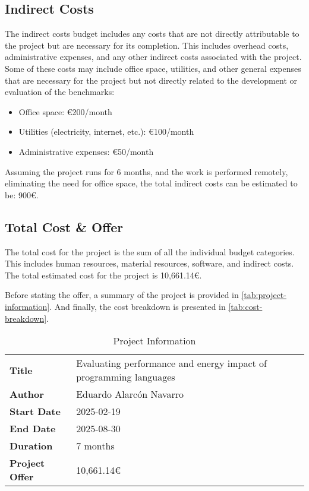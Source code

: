 \subsection{Indirect Costs}
The indirect costs budget includes any costs that are not directly attributable to the project but are necessary for its completion. This includes overhead costs, administrative expenses, and any other indirect costs associated with the project. 
Some of these costs may include office space, utilities, and other general expenses that are necessary for the project but not directly related to the development or evaluation of the benchmarks:
\begin{itemize}
    \item Office space: €200/month
    \item Utilities (electricity, internet, etc.): €100/month
    \item Administrative expenses: €50/month
\end{itemize}
Assuming the project runs for 6 months, and the work is performed remotely, eliminating the need for office space, the total indirect costs can be estimated to be: 900€.

\subsection{Total Cost \& Offer}
The total cost for the project is the sum of all the individual budget categories. This includes human resources, material resources, software, and indirect costs. The total estimated cost for the project is 10,661.14€.

Before stating the offer, a summary of the project is provided in \autoref{tab:project-information}. And finally, the cost breakdown is presented in \autoref{tab:cost-breakdown}.


\begin{table}[h]
  \centering
  \begin{tabular}{|l|l|}
    \hline
    \textbf{Title}         & Evaluating performance and energy impact of programming languages \\ 
    \textbf{Author}        & Eduardo Alarcón Navarro \\ 
    \textbf{Start Date}    & 2025-02-19 \\ 
    \textbf{End Date}      & 2025-08-30 \\ 
    \textbf{Duration}      & 7 months \\ 
    \hline
    \textbf{Project Offer} & 10,661.14€      \\ 
    \hline
  \end{tabular}
  \caption{Project Information}
  \label{tab:project-information}
\end{table}


